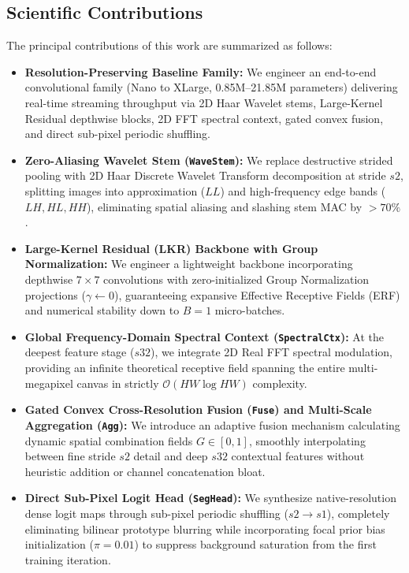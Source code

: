 \documentclass[11pt,a4paper]{article}
\begin{document}
\subsection{Scientific Contributions}
The principal contributions of this work are summarized as follows:
\begin{itemize}
    \item \textbf{Resolution-Preserving Baseline Family:} We engineer an end-to-end convolutional family (Nano to XLarge, 0.85M--21.85M parameters) delivering real-time streaming throughput via 2D Haar Wavelet stems, Large-Kernel Residual depthwise blocks, 2D FFT spectral context, gated convex fusion, and direct sub-pixel periodic shuffling.
    \item \textbf{Zero-Aliasing Wavelet Stem (\texttt{WaveStem}):} We replace destructive strided pooling with 2D Haar Discrete Wavelet Transform decomposition at stride $s2$, splitting images into approximation ($LL$) and high-frequency edge bands ($LH, HL, HH$), eliminating spatial aliasing and slashing stem MAC by $>70\%$.
    \item \textbf{Large-Kernel Residual (LKR) Backbone with Group Normalization:} We engineer a lightweight backbone incorporating depthwise $7\times 7$ convolutions with zero-initialized Group Normalization projections ($\gamma \leftarrow 0$), guaranteeing expansive Effective Receptive Fields (ERF) and numerical stability down to $B=1$ micro-batches.
    \item \textbf{Global Frequency-Domain Spectral Context (\texttt{SpectralCtx}):} At the deepest feature stage ($s32$), we integrate 2D Real FFT spectral modulation, providing an infinite theoretical receptive field spanning the entire multi-megapixel canvas in strictly $\mathcal{O}(HW \log HW)$ complexity.
    \item \textbf{Gated Convex Cross-Resolution Fusion (\texttt{Fuse}) and Multi-Scale Aggregation (\texttt{Agg}):} We introduce an adaptive fusion mechanism calculating dynamic spatial combination fields $G \in [0, 1]$, smoothly interpolating between fine stride $s2$ detail and deep $s32$ contextual features without heuristic addition or channel concatenation bloat.
    \item \textbf{Direct Sub-Pixel Logit Head (\texttt{SegHead}):} We synthesize native-resolution dense logit maps through sub-pixel periodic shuffling ($s2 \to s1$), completely eliminating bilinear prototype blurring while incorporating focal prior bias initialization ($\pi = 0.01$) to suppress background saturation from the first training iteration.

\end{itemize}
\end{document}
